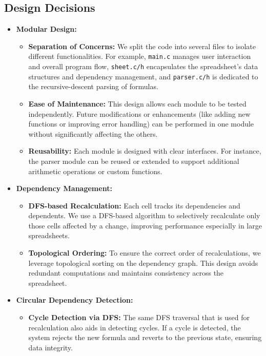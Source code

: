 \documentclass[11pt,a4paper]{article}
\begin{document}
\subsection{Design Decisions}
\begin{itemize}[noitemsep]
    \item \textbf{Modular Design:} 
    \begin{itemize}[noitemsep]
        \item \textbf{Separation of Concerns:} We split the code into several files to isolate different functionalities. For example, \texttt{main.c} manages user interaction and overall program flow, \texttt{sheet.c/h} encapsulates the spreadsheet’s data structures and dependency management, and \texttt{parser.c/h} is dedicated to the recursive-descent parsing of formulas.
        \item \textbf{Ease of Maintenance:} This design allows each module to be tested independently. Future modifications or enhancements (like adding new functions or improving error handling) can be performed in one module without significantly affecting the others.
        \item \textbf{Reusability:} Each module is designed with clear interfaces. For instance, the parser module can be reused or extended to support additional arithmetic operations or custom functions.
    \end{itemize}
    \item \textbf{Dependency Management:} 
    \begin{itemize}[noitemsep]
        \item \textbf{DFS-based Recalculation:} Each cell tracks its dependencies and dependents. We use a DFS-based algorithm to selectively recalculate only those cells affected by a change, improving performance especially in large spreadsheets.
        \item \textbf{Topological Ordering:} To ensure the correct order of recalculations, we leverage topological sorting on the dependency graph. This design avoids redundant computations and maintains consistency across the spreadsheet.
    \end{itemize}
    \item \textbf{Circular Dependency Detection:} 
    \begin{itemize}[noitemsep]
        \item \textbf{Cycle Detection via DFS:} The same DFS traversal that is used for recalculation also aids in detecting cycles. If a cycle is detected, the system rejects the new formula and reverts to the previous state, ensuring data integrity.

\end{itemize}
\end{itemize}
\end{document}
